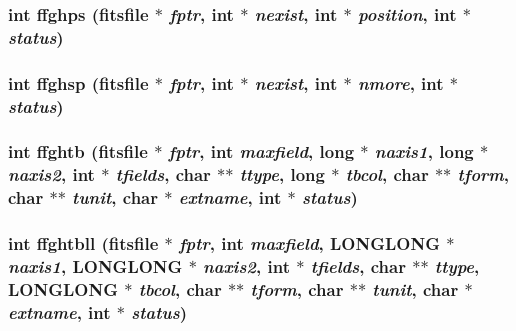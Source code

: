 \subsubsection{\setlength{\rightskip}{0pt plus 5cm}int ffghps (\bf{fitsfile} $\ast$ {\em fptr}, int $\ast$ {\em nexist}, int $\ast$ {\em position}, int $\ast$ {\em status})}\label{fitsio__64_8h_5bc2324399a2cc4c0cf179c6af73c253}


\subsubsection{\setlength{\rightskip}{0pt plus 5cm}int ffghsp (\bf{fitsfile} $\ast$ {\em fptr}, int $\ast$ {\em nexist}, int $\ast$ {\em nmore}, int $\ast$ {\em status})}\label{fitsio__64_8h_72d53ce1ae759524a27f68fc55dbc9ab}


\subsubsection{\setlength{\rightskip}{0pt plus 5cm}int ffghtb (\bf{fitsfile} $\ast$ {\em fptr}, int {\em maxfield}, long $\ast$ {\em naxis1}, long $\ast$ {\em naxis2}, int $\ast$ {\em tfields}, char $\ast$$\ast$ {\em ttype}, long $\ast$ {\em tbcol}, char $\ast$$\ast$ {\em tform}, char $\ast$$\ast$ {\em tunit}, char $\ast$ {\em extname}, int $\ast$ {\em status})}\label{fitsio__64_8h_31a49b3fe1b2a1e589794d420e2082fb}


\subsubsection{\setlength{\rightskip}{0pt plus 5cm}int ffghtbll (\bf{fitsfile} $\ast$ {\em fptr}, int {\em maxfield}, \bf{LONGLONG} $\ast$ {\em naxis1}, \bf{LONGLONG} $\ast$ {\em naxis2}, int $\ast$ {\em tfields}, char $\ast$$\ast$ {\em ttype}, \bf{LONGLONG} $\ast$ {\em tbcol}, char $\ast$$\ast$ {\em tform}, char $\ast$$\ast$ {\em tunit}, char $\ast$ {\em extname}, int $\ast$ {\em status})}\label{fitsio__64_8h_62e73d788b8463ca174a441efd62c055}


